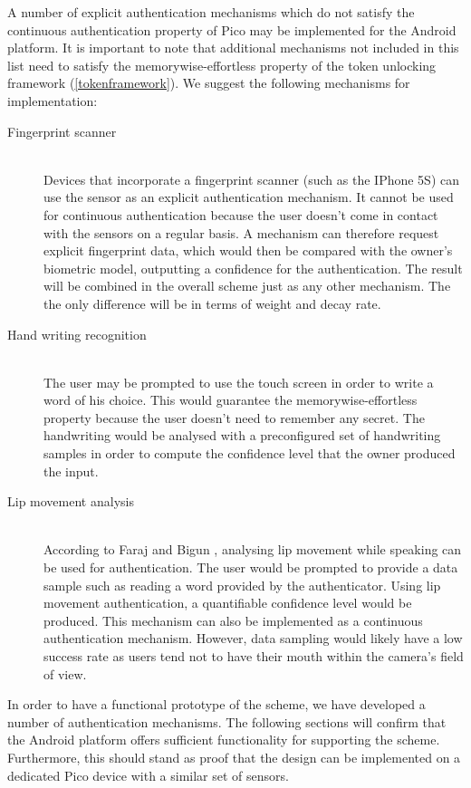 A number of explicit authentication mechanisms which do not satisfy the continuous authentication property of Pico may be implemented for the Android platform. It is important to note that additional mechanisms not included in this list need to satisfy the memorywise-effortless property of the token unlocking framework (\ref{tokenframework}). We suggest the following mechanisms for implementation:
\begin{description}
  \item[Fingerprint scanner] \hfill \\
  Devices that incorporate a fingerprint scanner (such as the IPhone 5S) can use the sensor as an explicit authentication mechanism. It cannot be used for continuous authentication because the user doesn't come in contact with the sensors on a regular basis. A mechanism can therefore request explicit fingerprint data, which would then be compared with the owner's biometric model, outputting a confidence for the authentication. The result will be combined in the overall scheme just as any other mechanism. The the only difference will be in terms of weight and decay rate.
    
  \item[Hand writing recognition] \hfill \\
  The user may be prompted to use the touch screen in order to write a word of his choice. This would guarantee the memorywise-effortless property because the user doesn't need to remember any secret. The handwriting would be analysed with a preconfigured set of handwriting samples in order to compute the confidence level that the owner produced the input.
  
  \item[Lip movement analysis] \hfill \\
  According to Faraj and Bigun \cite{faraj2006motion}, analysing lip movement while speaking can be used for authentication. The user would be prompted to provide a data sample such as reading a word provided by the authenticator. Using lip movement authentication, a quantifiable confidence level would be produced. This mechanism can also be implemented as a continuous authentication mechanism. However, data sampling would likely have a low success rate as users tend not to have their mouth within the camera's field of view.
\end{description}

In order to have a functional prototype of the scheme, we have developed a number of authentication mechanisms. The following sections will confirm that the Android platform offers sufficient functionality for supporting the scheme. Furthermore, this should stand as proof that the design can be implemented on a dedicated Pico device with a similar set of sensors.

